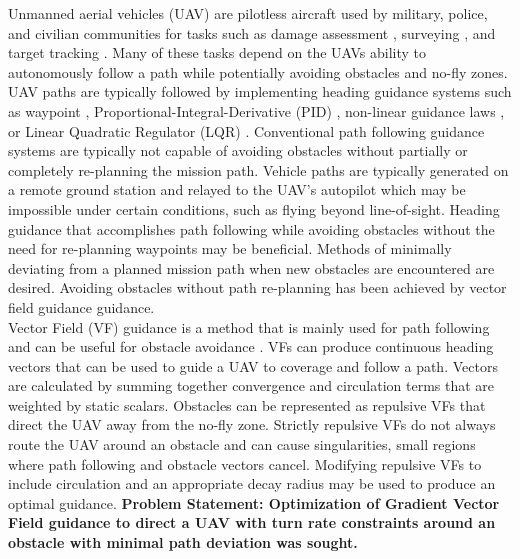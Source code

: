 \documentclass[numbered,pdftex]{ohio-etd}
\begin{document}
Unmanned aerial vehicles (UAV) are pilotless aircraft used by military, police, and civilian communities for tasks such as damage assessment \cite{fernandez_galarreta_uav-based_2015}, surveying \cite{remondino_uav_2012}, and target tracking \cite{ariyur_autonomous_2008,teuliere_chasing_2011,frew_cooperative_2007,oh_coordinated_2013,hyondong_oh_coordinated_2015,oliveira_moving_2016}. Many of these tasks depend on the UAVs ability to autonomously follow a path while potentially avoiding obstacles and no-fly zones. UAV paths are typically followed by implementing heading guidance systems such as waypoint \cite{osborne_waypoint_2005}, Proportional-Integral-Derivative (PID) \cite{rhee2010tight}, non-linear guidance laws \cite{park2007performance}, or Linear Quadratic Regulator (LQR) \cite{ratnoo_adaptive_2011}. Conventional path following guidance systems are typically not capable of avoiding obstacles without partially or completely re-planning the mission path. Vehicle paths are typically generated on a remote ground station and relayed to the UAV’s autopilot which may be impossible under certain conditions, such as flying beyond line-of-sight. Heading guidance that accomplishes path following while avoiding obstacles without the need for re-planning waypoints may be beneficial. Methods of minimally deviating from a planned mission path when new obstacles are encountered are desired. Avoiding obstacles without path re-planning has been achieved by vector field guidance \cite{frew_cooperative_2007,griffiths_vector_2006,goncalves_artificial_2009,goncalves_circulation_2010,goncalves_vector_2010} guidance.\\

 

Vector Field (VF) guidance is a method that is mainly used for path following \cite{nelson_cooperative_2005,nelson_vector_2006,nelson_vector_2007,griffiths_vector_2006,goncalves_artificial_2009,goncalves_circulation_2010,goncalves_vector_2010} and can be useful for obstacle avoidance \cite{panagou_motion_2014,wilhelm_2019}. VFs can produce continuous heading vectors that can be used to guide a UAV to coverage and follow a path. Vectors are calculated by summing together convergence and circulation terms that are weighted by static scalars. Obstacles can be represented as repulsive VFs that direct the UAV away from the no-fly zone. Strictly repulsive VFs do not always route the UAV around an obstacle and can cause singularities, small regions where path following and obstacle vectors cancel. Modifying repulsive VFs to include circulation and an appropriate decay radius may be used to produce an optimal guidance. \textbf{Problem Statement: Optimization of Gradient Vector Field guidance to direct a UAV with turn rate constraints around an obstacle with minimal path deviation was sought.}
 \pagebreak
 
\end{document}
